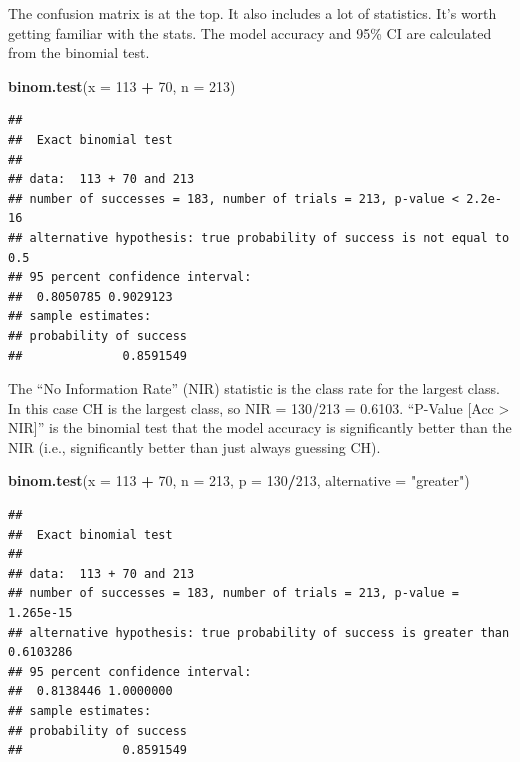 \documentclass[
]{book}
\newenvironment{Shaded}{\begin{snugshade}}{\end{snugshade}}
\newcommand{\DataTypeTok}[1]{\textcolor[rgb]{0.13,0.29,0.53}{#1}}
\newcommand{\DecValTok}[1]{\textcolor[rgb]{0.00,0.00,0.81}{#1}}
\newcommand{\KeywordTok}[1]{\textcolor[rgb]{0.13,0.29,0.53}{\textbf{#1}}}
\newcommand{\NormalTok}[1]{#1}
\newcommand{\OperatorTok}[1]{\textcolor[rgb]{0.81,0.36,0.00}{\textbf{#1}}}
\newcommand{\StringTok}[1]{\textcolor[rgb]{0.31,0.60,0.02}{#1}}
\begin{document}
The confusion matrix is at the top. It also includes a lot of statistics. It's worth getting familiar with the stats. The model accuracy and 95\% CI are calculated from the binomial test.

\begin{Shaded}
\begin{Highlighting}[]
\KeywordTok{binom.test}\NormalTok{(}\DataTypeTok{x =} \DecValTok{113} \OperatorTok{+}\StringTok{ }\DecValTok{70}\NormalTok{, }\DataTypeTok{n =} \DecValTok{213}\NormalTok{)}
\end{Highlighting}
\end{Shaded}

\begin{verbatim}
## 
##  Exact binomial test
## 
## data:  113 + 70 and 213
## number of successes = 183, number of trials = 213, p-value < 2.2e-16
## alternative hypothesis: true probability of success is not equal to 0.5
## 95 percent confidence interval:
##  0.8050785 0.9029123
## sample estimates:
## probability of success 
##              0.8591549
\end{verbatim}

The ``No Information Rate'' (NIR) statistic is the class rate for the largest class. In this case CH is the largest class, so NIR = 130/213 = 0.6103. ``P-Value {[}Acc \textgreater{} NIR{]}'' is the binomial test that the model accuracy is significantly better than the NIR (i.e., significantly better than just always guessing CH).

\begin{Shaded}
\begin{Highlighting}[]
\KeywordTok{binom.test}\NormalTok{(}\DataTypeTok{x =} \DecValTok{113} \OperatorTok{+}\StringTok{ }\DecValTok{70}\NormalTok{, }\DataTypeTok{n =} \DecValTok{213}\NormalTok{, }\DataTypeTok{p =} \DecValTok{130}\OperatorTok{/}\DecValTok{213}\NormalTok{, }\DataTypeTok{alternative =} \StringTok{"greater"}\NormalTok{)}
\end{Highlighting}
\end{Shaded}

\begin{verbatim}
## 
##  Exact binomial test
## 
## data:  113 + 70 and 213
## number of successes = 183, number of trials = 213, p-value = 1.265e-15
## alternative hypothesis: true probability of success is greater than 0.6103286
## 95 percent confidence interval:
##  0.8138446 1.0000000
## sample estimates:
## probability of success 
##              0.8591549
\end{verbatim}
\end{document}
